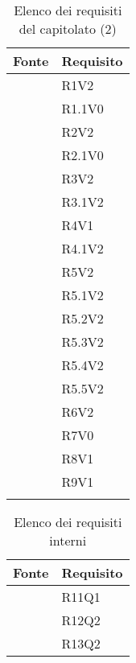 		\begin{table}[H]
			\centering
			{\def\arraystretch{1.4}
			\begin{tabularx}{\textwidth}{YY}
				\textbf{Fonte} & \textbf{Requisito} \\
				\toprule
		         & R1V2 \\
				 & R1.1V0 \\
				 & R2V2 \\
				 & R2.1V0 \\
				 & R3V2 \\
				 & R3.1V2 \\
				 & R4V1 \\
				 & R4.1V2 \\
				 & R5V2 \\
				 & R5.1V2 \\
				 & R5.2V2 \\
				 & R5.3V2 \\
				 & R5.4V2 \\
				 & R5.5V2 \\
				 & R6V2 \\
				 & R7V0 \\
				 & R8V1 \\
				  & R9V1 \\
				\bottomrule\\
			\end{tabularx}}
			\caption{Elenco dei requisiti del capitolato (2)}
		\end{table}

		\begin{table}[H]
			\centering
			{\def\arraystretch{1.5}
				\begin{tabularx}{\textwidth}{YY}
					\textbf{Fonte} & \textbf{Requisito} \\
					\toprule
					 & R11Q1 \\
					 & R12Q2 \\
					  & R13Q2 \\
					\bottomrule
				\end{tabularx}}
			\caption{Elenco dei requisiti interni}
		\end{table}

